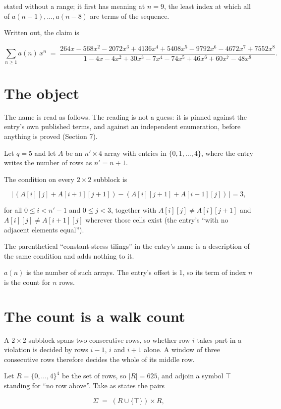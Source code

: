 \documentclass[11pt]{article}
\theoremstyle{definition}
\begin{document}
stated without a range; it first has meaning at $n = 9$, the least index at which all of $a(n-1),\dots,a(n-8)$ are terms of the sequence.

Written out, the claim is

\[\sum_{n \ge 1} a(n)\,x^n \;=\; \frac{264x - 568x^{2} - 2072x^{3} + 4136x^{4} + 5408x^{5} - 9792x^{6} - 4672x^{7} + 7552x^{8}}{1 - 4x - 4x^{2} + 30x^{3} - 7x^{4} - 74x^{5} + 46x^{6} + 60x^{7} - 48x^{8}}.\]

\section{The object}

The name is read as follows. The reading is not a guess: it is pinned against the entry's own published terms, and against an independent enumeration, before anything is proved (Section 7).

Let $q = 5$ and let $A$ be an $n' \times 4$ array with entries in $\{0,1,\dots,4\}$, where the entry writes the number of rows as $n' = n + 1$.

The condition on every $2 \times 2$ subblock is

\[\bigl|\,(A[i][j] + A[i{+}1][j{+}1]) - (A[i][j{+}1] + A[i{+}1][j])\,\bigr| = 3,\]

for all $0 \le i < n'-1$ and $0 \le j < 3$, together with $A[i][j] \ne A[i][j{+}1]$ and $A[i][j] \ne A[i{+}1][j]$ wherever those cells exist (the entry's ``with no adjacent elements equal'').

The parenthetical ``constant-stress tilings'' in the entry's name is a description of the same condition and adds nothing to it.

$a(n)$ is the number of such arrays. The entry's offset is 1, so its term of index $n$ is the count for $n$ rows.

\section{The count is a walk count}

A $2 \times 2$ subblock spans two consecutive rows, so whether row $i$ takes part in a violation is decided by rows $i-1$, $i$ and $i+1$ alone. A window of three consecutive rows therefore decides the whole of its middle row.

Let $R = \{0,\dots,4\}^{4}$ be the set of rows, so $|R| = 625$, and adjoin a symbol $\top$ standing for ``no row above''. Take as states the pairs

\[\Sigma \;=\; (R \cup \{\top\}) \times R,\]
\end{document}
